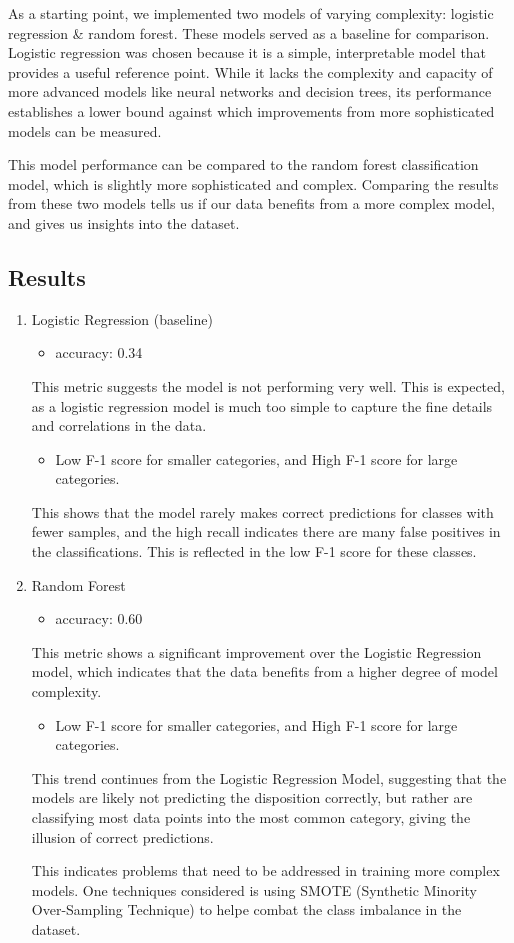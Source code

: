 \documentclass[final]{article}
\begin{document}
As a starting point, we implemented two models of varying complexity: logistic regression & random forest. These models served as a baseline for comparison. Logistic regression was chosen because it is a simple, interpretable model that provides a useful reference point. While it lacks the complexity and capacity of more advanced models like neural networks and decision trees, its performance establishes a lower bound against which improvements from more sophisticated models can be measured. 

This model performance can be compared to the random forest classification model, which is slightly more sophisticated and complex. Comparing the results from these two models tells us if our data benefits from a more complex model, and gives us insights into the dataset.

\subsection{Results}
\begin{enumerate}
  \item Logistic Regression (baseline)
  \begin{itemize}
    \item accuracy: 0.34
  \end{itemize}
  This metric suggests the model is not performing very well. This is expected, as a logistic regression model is much too simple to capture the fine details and correlations in the data.
  \begin{itemize}
    \item Low F-1 score for smaller categories, and High F-1 score for large categories.
  \end{itemize}
  This shows that the model rarely makes correct predictions for classes with fewer samples, and the high recall indicates there are many false positives in the classifications. This is reflected in the low F-1 score for these classes.
  \item Random Forest
  \begin{itemize}
    \item accuracy: 0.60
  \end{itemize}
  This metric shows a significant improvement over the Logistic Regression model, which indicates that the data benefits from a higher degree of model complexity.
  \begin{itemize}
    \item Low F-1 score for smaller categories, and High F-1 score for large categories.
  \end{itemize}
  This trend continues from the Logistic Regression Model, suggesting that the models are likely not predicting the disposition correctly, but rather are classifying most data points into the most common category, giving the illusion of correct predictions.

  This indicates problems that need to be addressed in training more complex models. One techniques considered is using SMOTE (Synthetic Minority Over-Sampling Technique) to helpe combat the class imbalance in the dataset.
\end{enumerate}
\end{document}
